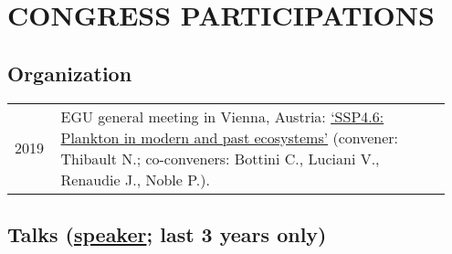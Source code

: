 \documentclass[11pt, a4paper]{article}
\begin{document}
\section{CONGRESS PARTICIPATIONS}
\subsection{Organization}
\begin{longtable}{p{0.1\linewidth} P{0.85\linewidth}}
2019 & EGU general meeting in Vienna, Austria: \href{https://meetingorganizer.copernicus.org/EGU2019/session/31041}{`SSP4.6: Plankton in modern and past ecosystems'} (convener: Thibault N.; co-conveners: Bottini C., Luciani V., Renaudie J., Noble P.).
\end{longtable}
\subsection[Talks]{Talks \textnormal{\footnotesize{(\underline{speaker}; last 3 years only)}}}
\end{document}
